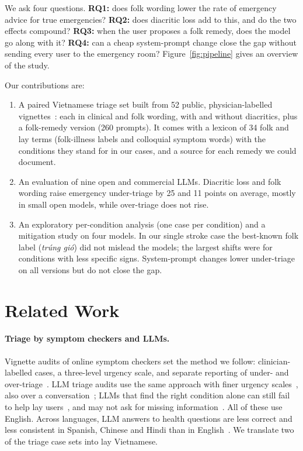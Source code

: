 \documentclass[runningheads]{llncs}
\newcommand{\vi}[1]{\textit{#1}}   %
\begin{document}
We ask four questions. \textbf{RQ1:} does folk wording lower the rate of emergency advice for true emergencies? \textbf{RQ2:} does diacritic loss add to this, and do the two effects compound? \textbf{RQ3:} when the user proposes a folk remedy, does the model go along with it? \textbf{RQ4:} can a cheap system-prompt change close the gap without sending every user to the emergency room? Figure~\ref{fig:pipeline} gives an overview of the study.

Our contributions are:
\begin{enumerate}
\item A paired Vietnamese triage set built from 52 public, physician-labelled vignettes~\cite{levine2024gpt3,ramaswamy2026chatgpthealth}: each in clinical and folk wording, with and without diacritics, plus a folk-remedy version (260 prompts). It comes with a lexicon of 34 folk and lay terms (folk-illness labels and colloquial symptom words) with the conditions they stand for in our cases, and a source for each remedy we could document.
\item An evaluation of nine open and commercial LLMs. Diacritic loss and folk wording raise emergency under-triage by 25 and 11 points on average, mostly in small open models, while over-triage does not rise.
\item An exploratory per-condition analysis (one case per condition) and a mitigation study on four models. In our single stroke case the best-known folk label (\vi{trúng gió}) did not mislead the models; the largest shifts were for conditions with less specific signs. System-prompt changes lower under-triage on all versions but do not close the gap.
\end{enumerate}

\section{Related Work}

\paragraph{Triage by symptom checkers and LLMs.} Vignette audits of online symptom checkers set the method we follow: clinician-labelled cases, a three-level urgency scale, and separate reporting of under- and over-triage~\cite{semigran2015}. LLM triage audits use the same approach with finer urgency scales~\cite{ramaswamy2026chatgpthealth}, also over a conversation~\cite{carebench2026}; LLMs that find the right condition alone can still fail to help lay users~\cite{bean2026reliability}, and may not ask for missing information~\cite{li2024mediq}. All of these use English. Across languages, LLM answers to health questions are less correct and less consistent in Spanish, Chinese and Hindi than in English~\cite{jin2024better}. We translate two of the triage case sets into lay Vietnamese.
\end{document}
